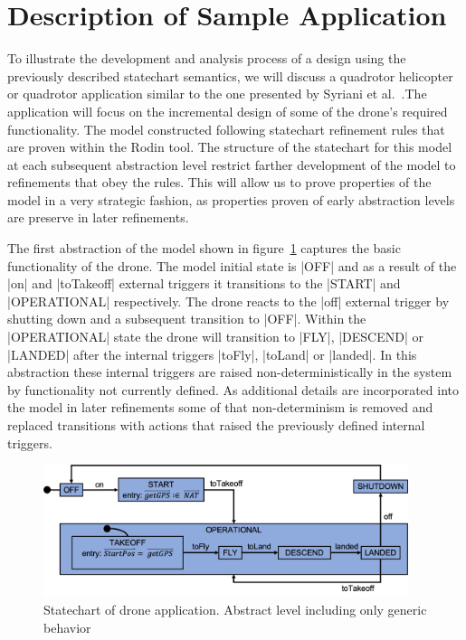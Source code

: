 

\section{Description of Sample Application}

To illustrate the development and analysis process of a design using the previously described 
statechart semantics, we will discuss a quadrotor helicopter or quadrotor application similar to 
the one presented by Syriani et al.~\cite{Syriani_2019}.The application will focus on the incremental 
design of some of the drone's required functionality.
The model constructed following statechart refinement rules that are proven within the Rodin tool.
The structure of the statechart for this model at each subsequent abstraction level restrict farther 
development of the model to refinements that obey the rules. This will allow us to prove properties 
of the model in a very strategic fashion, as properties proven of early abstraction levels 
are preserve in later refinements.

The first abstraction of the model shown in figure~\ref{fig:drone1} captures the basic 
functionality of the drone. The model initial state is |OFF| and as a result of the |on| and 
|toTakeoff| external triggers it transitions to the |START| and |OPERATIONAL| respectively. 
The drone reacts to the |off| external trigger by shutting down and a subsequent transition to |OFF|.
Within the |OPERATIONAL| state the drone will transition to |FLY|, |DESCEND| or |LANDED| 
after the internal triggers |toFly|, |toLand| or |landed|. In this abstraction these internal 
triggers are raised non-deterministically in the system by functionality not currently defined.
As additional details are incorporated into the model in later refinements some of that non-determinism is 
removed and replaced transitions with actions that raised the previously defined internal triggers.

\begin{figure}[!h]
	\vspace{-.4cm}
	\centering
	\includegraphics[width=0.95\textwidth]{figures/Picture1.png}
	\caption{Statechart of drone application. Abstract level including only generic behavior }
	\label{fig:drone1}
	\vspace{-.4cm}
\end{figure} 

